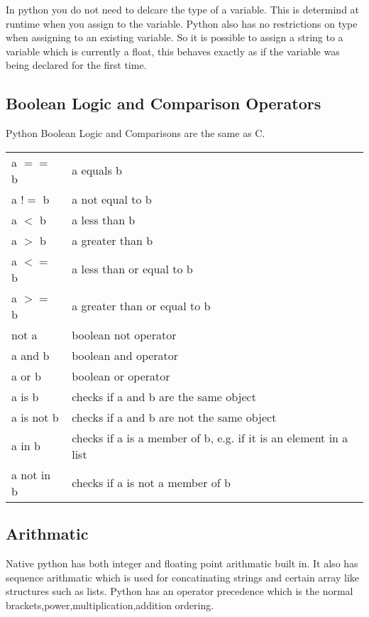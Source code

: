 \documentclass[11pt,a4paper]{article}
\begin{document}
In python you do not need to delcare the type of a variable. This is determind at runtime when you assign to the variable. Python also has no restrictions on type when assigning to an existing variable. So it is possible to assign a string to a variable which is currently a float, this behaves exactly as if the variable was being declared for the first time.

\subsection{Boolean Logic and Comparison Operators}

Python Boolean Logic and Comparisons are the same as C.

\begin{center}
\begin{tabular}{l l}
a $==$ b & a equals b \\ 
a $!=$ b & a not equal to b \\
a $<$ b & a less than b \\
a $>$ b & a greater than b \\
a $<=$ b & a less than or equal to b\\
a $>=$ b & a greater than or equal to b\\
not a & boolean not operator \\
a and b & boolean and operator \\
a or b & boolean or operator \\
a is b & checks if a and b are the same object \\
a is not b & checks if a and b are not the same object \\
a in b & checks if a is a member of b, e.g. if it is an element in
a list \\
a not in b & checks if a is not a member of b\\
\end{tabular}
\end{center}


\subsection{Arithmatic}

Native python has both integer and floating point arithmatic built in. It also has sequence arithmatic which is used for concatinating strings and certain array like structures such as lists. Python has an operator precedence which is the normal brackets,power,multiplication,addition ordering.
\end{document}
